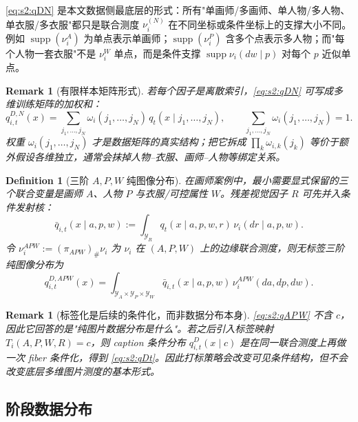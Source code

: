 \documentclass[11pt,a4paper]{article}
\newtheorem{definition}[theorem]{Definition}
\newtheorem{remark}[theorem]{Remark}
\DeclareMathOperator{\supp}{supp}
\newcommand{\cY}{\mathcal{Y}}
\begin{document}
\noindent \eqref{eq:s2:qDN} 是本文数据侧最底层的形式：所有"单画师/多画师、单人物/多人物、单衣服/多衣服"都只是联合测度 $\nu_i^{(N)}$ 在不同坐标或条件坐标上的支撑大小不同。例如 $\supp(\nu_i^A)$ 为单点表示单画师；$\supp(\nu_i^P)$ 含多个点表示多人物；而"每个人物一套衣服"不是 $\nu_i^W$ 单点，而是条件支撑 $\supp\nu_i(dw\mid p)$ 对每个 $p$ 近似单点。

\begin{remark}[有限样本矩阵形式]\label{rem:s2:finiteN}
若每个因子是离散索引，\eqref{eq:s2:qDN} 可写成多维训练矩阵的加权和：
\begin{equation}\label{eq:s2:qDNfinite}
q_{i,t}^{D,N}(x)
=
\sum_{j_1,\ldots,j_N}
\omega_i(j_1,\ldots,j_N)\,
q_t(x\mid j_1,\ldots,j_N),
\qquad
\sum_{j_1,\ldots,j_N}\omega_i(j_1,\ldots,j_N)=1.
\end{equation}
权重 $\omega_i(j_1,\ldots,j_N)$ 才是数据矩阵的真实结构；把它拆成 $\prod_k\omega_{i,k}(j_k)$ 等价于额外假设各维独立，通常会抹掉人物--衣服、画师--人物等绑定关系。
\end{remark}

\begin{definition}[三阶 $A,P,W$ 纯图像分布]\label{def:s2:APW}
在画师案例中，最小需要显式保留的三个联合变量是画师 $A$、人物 $P$ 与衣服/可控属性 $W$。残差视觉因子 $R$ 可先并入条件发射核：
\begin{equation}\label{eq:s2:qAPWemission}
\bar q_{i,t}(x\mid a,p,w)
:=
\int_{\cY_R}q_t(x\mid a,p,w,r)\,\nu_i(dr\mid a,p,w).
\end{equation}
令 $\nu_i^{APW}:=(\pi_{APW})_\#\nu_i$ 为 $\nu_i$ 在 $(A,P,W)$ 上的边缘联合测度，则无标签三阶纯图像分布为
\begin{equation}\label{eq:s2:qAPW}
q_{i,t}^{D,APW}(x)
=
\int_{\cY_A\times\cY_P\times\cY_W}
\bar q_{i,t}(x\mid a,p,w)\,
\nu_i^{APW}(da,dp,dw).
\end{equation}
\end{definition}

\begin{remark}[标签化是后续的条件化，而非数据分布本身]\label{rem:s2:unlabeled-vs-caption}
\eqref{eq:s2:qAPW} 不含 $c$，因此它回答的是"纯图片数据分布是什么"。若之后引入标签映射 $T_i(A,P,W,R)=c$，则 caption 条件分布 $q_{i,t}^D(x\mid c)$ 是在同一联合测度上再做一次 fiber 条件化，得到 \eqref{eq:s2:qDt}。因此打标策略会改变\emph{可见条件结构}，但不会改变底层多维图片测度的基本形式。
\end{remark}

\subsection{阶段数据分布}\label{ss:s2:stagedensity}
\end{document}
